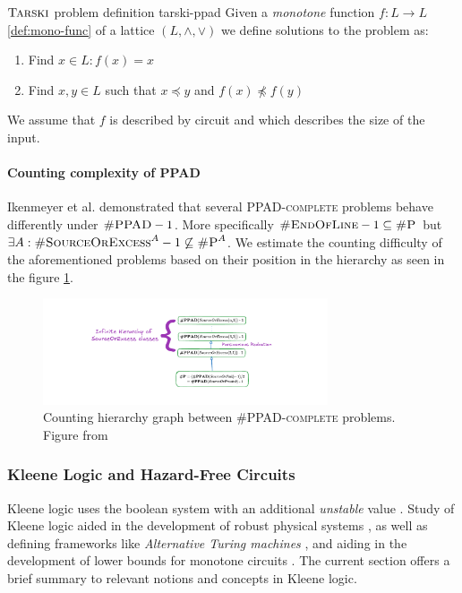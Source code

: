 \begin{definitionbox}{$\textnormal{\textsc{Tarski}}$ problem definition \cite{fearnley_FasterAlgorithmFinding_2022}}{tarski-ppad}
    Given a \textit{monotone} function $f: L \to L$ \ref{def:mono-func} of a lattice $(L, \wedge, \vee)$
    we define solutions to the problem as:
    \begin{enumerate}
        \item Find $x \in L: f(x) = x$
        \item Find $x,y \in L$ such that $x \preceq y$ and $f(x) \not\preceq f(y)$
    \end{enumerate}
    We assume that $f$ is described by circuit and which describes the size of the input.
\end{definitionbox}
%
\paragraph{Counting complexity of PPAD}
\label{par:count-ppad}


Ikenmeyer et al. \cite{ikenmeyer_WhatWhatNot_2022} demonstrated that several \textsc{PPAD-complete}
problems behave differently under $\textsc{\#PPAD} -1$. More specifically
$\textsc{\#EndOfLine} - 1 \subseteq \textsc{\#P}$ but $\exists A: \textsc{\#SourceOrExcess}^A  - 1\not\subseteq \textsc{\#P}^A$.
We estimate the counting difficulty of the aforementioned problems based on their position in the hierarchy as seen in the figure \ref{fig:ppad-count-hier}.

\begin{figure}[h!]
    \centering
    \includegraphics[width=0.75\textwidth]{assets/chart-plot.pdf}
    \caption{Counting hierarchy graph between \textsc{\#PPAD-complete} problems. Figure from \cite{ikenmeyer_WhatWhatNot_2022}}\label{fig:ppad-count-hier}
\end{figure}


\subsubsection{Kleene Logic and Hazard-Free Circuits}

Kleene logic uses the boolean system with an additional \textit{unstable} value \cite{kleene_IntroductionMetamathematics_2009}. 
Study of Kleene logic aided in
the development of robust physical systems \cite{friedrichs_MetastabilityContainingCircuits_2018}, as well as
defining frameworks like \textit{Alternative Turing machines} \cite{kozen_TheoryComputation_2006}, and
aiding in the development of lower bounds for monotone circuits
\cite{eichelberger_HazardDetectionCombinational_1965, ikenmeyer_ComplexityHazardfreeCircuits_2019,ikenmeyer_KarchmerWigdersonGamesHazardfree_2022,  bund_SmallHazardFreeTransducers_2025}. 
The current section offers a brief summary to relevant notions and concepts in Kleene logic.

